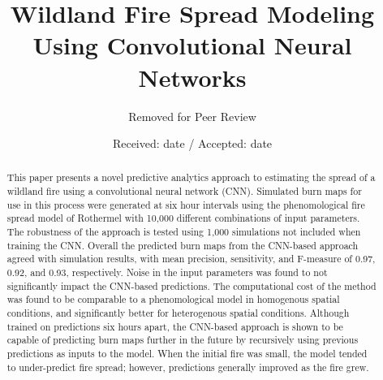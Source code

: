 \documentclass[smallcondensed]{svjour3}     %
\begin{document}
\title{Wildland Fire Spread Modeling Using Convolutional Neural Networks
}
\author{Removed for Peer Review}

\date{Received: date / Accepted: date}


\maketitle

\begin{abstract}
This paper presents a novel predictive analytics approach to estimating
the spread of a wildland fire using a convolutional neural network
(CNN). Simulated burn maps for use in this process were
generated at six hour intervals using the phenomological fire spread model
of Rothermel with 10,000 different combinations of input parameters.
The robustness of the approach is tested using 1,000 simulations not
included when training the CNN. Overall the predicted burn maps 
from the CNN-based approach agreed with simulation results,
with mean precision, sensitivity, and F-measure of 0.97, 0.92, and 0.93,
respectively. Noise in the input parameters was found to not significantly
impact the CNN-based predictions. The computational cost of the method
was found to be comparable to a phenomological model in homogenous spatial
conditions, and significantly better for heterogenous spatial conditions.
Although trained on predictions six hours apart, the
CNN-based approach is shown to be capable of predicting burn maps
further in the future by recursively using previous predictions as inputs to
the model. When the initial fire was small, the model tended to under-predict
fire spread; however, predictions generally improved as the fire grew.

\end{abstract}
\end{document}
